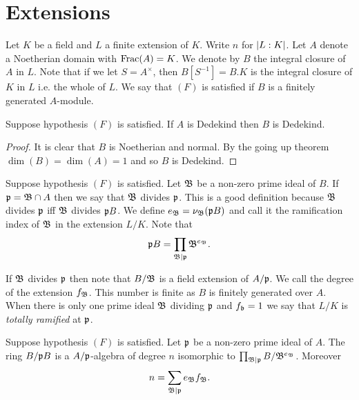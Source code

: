 \documentclass{memoir}
\begin{document}
\section{Extensions}
\begin{notation}
    Let $K$ be a field and $L$ a finite extension of $K$.
    Write $n$ for $\lvert L:K\rvert$.
    Let $A$ denote a Noetherian domain with $\text{Frac}(A) = K$.
    We denote by $B$ the integral closure of $A$ in $L$.
    Note that if we let $S = A^\times$, then $B[S^{-1}] = B.K$ is the integral closure of $K$ in $L$ i.e. the whole of $L$.
    We say that $(F)$ is satisfied if $B$ is a finitely generated $A$-module.
\end{notation}
\begin{proposition}
    Suppose hypothesis $(F)$ is satisfied.
    If $A$ is Dedekind then $B$ is Dedekind.
\end{proposition}
\begin{proof}
    It is clear that $B$ is Noetherian and normal.
    By the going up theorem $\dim(B) = \dim(A) = 1$ and so $B$ is Dedekind.
\end{proof}
\begin{definition}
    Suppose hypothesis $(F)$ is satisfied.
    Let $\mathfrak{B}$ be a non-zero prime ideal of $B$.
    If $\mathfrak{p} = \mathfrak{B} \cap A$ then we say that $\mathfrak{B}$ divides $\mathfrak{p}$.
    This is a good definition because $\mathfrak{B}$ divides $\mathfrak{p}$ iff $\mathfrak{B}$ divides $\mathfrak{p}B$.
    We define $e_{\mathfrak{B}} = \nu_{\mathfrak{B}}(\mathfrak{p}B)$ and call it the ramification index of $\mathfrak{B}$ in the extension $L/K$.
    Note that 
    \begin{equation}
        \mathfrak{p}B = \prod_{\mathfrak{B}\mid \mathfrak{p}}\mathfrak{B}^{e_{\mathfrak{B}}}.
    \end{equation}

    If $\mathfrak{B}$ divides $\mathfrak{p}$ then note that $B/\mathfrak{B}$ is a field extension of $A/\mathfrak{p}$.
    We call the degree of the extension $f_{\mathfrak{B}}$.
    This number is finite as $B$ is finitely generated over $A$.
    When there is only one prime ideal $\mathfrak{B}$ dividing $\mathfrak{p}$ and $f_{\mathfrak{b}} = 1$ we say that $L/K$ is \textit{totally ramified} at $\mathfrak{p}$.
\end{definition}
\begin{thm}
    Suppose hypothesis $(F)$ is satisfied.
    Let $\mathfrak{p}$  be a non-zero prime ideal of $A$. 
    The ring $B/\mathfrak{p}B$ is a $A/\mathfrak{p}$-algebra of degree $n$ isomorphic to $\prod_{\mathfrak{B}\mid \mathfrak{p}}B/\mathfrak{B}^{e_{\mathfrak{B}}}$.
    Moreover 
    \begin{equation}
        n = \sum_{\mathfrak{B}\mid \mathfrak{p}}e_{\mathfrak{B}}f_{\mathfrak{B}}.
    \end{equation}
\end{thm}
\end{document}
